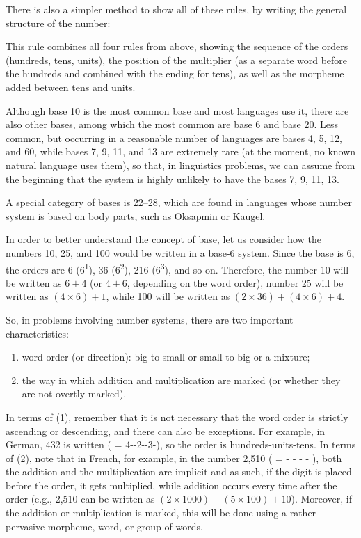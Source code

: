 \begin{refsection}
 There is also a simpler method to show all of these rules, by writing the general structure of the number:


 This rule combines all four rules from above, showing the sequence of the orders (hundreds, tens, units), the position of the multiplier (as a separate word before the hundreds and combined with the ending  for tens), as well as the morpheme  added between tens and units.

Although base 10 is the most common base and most languages use it, there are also other bases, among which the most common are base 6 and base 20. Less common, but occurring in a reasonable number of languages are bases 4, 5, 12, and 60, while bases 7, 9, 11, and 13 are extremely rare (at the moment, no known natural language uses them), so that, in linguistics problems, we can assume from the beginning that the system is highly unlikely to have the bases 7, 9, 11, 13.

A special category of bases is 22–28, which are found in languages whose number system is based on body parts, such as Oksapmin or Kaugel.

In order to better understand the concept of base, let us consider how the numbers 10, 25, and 100 would be written in a base-6 system. Since the base is 6, the orders are 6 (6\textsuperscript{1}), 36 (6\textsuperscript{2}), 216 (6\textsuperscript{3}), and so on. Therefore, the number 10 will be written as $6+4$ (or $4+6$, depending on the word order), number 25 will be written as $(4\times6)+1$, while 100 will be written as $(2\times36)+(4\times6)+4$.

So, in problems involving number systems, there are two important characteristics:

\begin{enumerate}[label = (\arabic*)]
    \item word order (or direction): big-to-small or small-to-big or a mixture;
    \item the way in which addition and multiplication are marked (or whether they are not overtly marked).
\end{enumerate}

In terms of (1), remember that it is not necessary that the word order is strictly ascending or descending, and there can also be exceptions. For example, in German, 432 is written  ( = 4--2--3-), so the order is hundreds-units-tens. In terms of (2), note that in French, for example, in the number 2,510 ( =  -  -  -  - ), both the addition and the multiplication are implicit and as such, if the digit is placed before the order, it gets multiplied, while addition occurs every time after the order (e.g., 2,510 can be written as $(2\times1000)+(5\times100)+10$). Moreover, if the addition or multiplication is marked, this will be done using a rather pervasive morpheme, word, or group of words.


\end{refsection}
